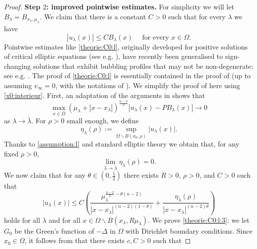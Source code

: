 \documentclass[10pt]{amsart}
\numberwithin{equation}{section}
\newcommand{\Om}{\Omega}
\def \xl{x_\lambda}
\def\la{\lambda}
\theoremstyle{plain}
\theoremstyle{remark}
\begin{document}
\begin{proof}
\textbf{Step $2$: improved pointwise estimates.} For simplicity we will let $B_\lambda = B_{x_\lambda, \mu_\lambda}$. We claim that there is a constant $C >0$ such that for every $\lambda$ we have
\begin{equation} \label{theorie:C0:l}
|u_\lambda(x) | \le C B_\lambda(x)\quad \text{ for every } x \in \Om.	
\end{equation}
Pointwise estimates like \eqref{theorie:C0:l}, originally developed for positive solutions of critical elliptic equations (see e.g. \cite{Druetdim3, DruetHebeyRobert}), have recently been generalised to sign-changing solutions that exhibit bubbling profiles that may not be non-degenerate: see e.g. \cite{Premoselli13, PremoselliRobert, PremoselliVetois4}. The proof of \eqref{theorie:C0:l} is essentially contained in the proof of \cite[Theorem 2.1]{CheikhAliPremoselli} (up to assuming $v_\infty = 0$, with the notations of \cite{CheikhAliPremoselli}). We simplify the proof of \cite[Theorem 2.1]{CheikhAliPremoselli} here using \eqref{x0:interieur}. First, an adaptation of the arguments in \cite[Proposition 2.2]{CheikhAliPremoselli} shows that
\begin{equation} \label{theorie:C0:l:1}
\max_{x \in \overline{\Om}} (\mu_\lambda + |x-x_\lambda|)^{\frac{n-2}{2}} | u_\lambda(x) - P B_\lambda(x) | \to 0 
\end{equation}
as $\lambda \to \bar{\lambda}$. For $\rho>0$ small enough, we define
\begin{equation*}
	\eta_{\lambda}(\rho):=\sup_{\Om\backslash B(x_0, \rho)} \big| u_\lambda(x)\big|.
\end{equation*} 
Thanks to \eqref{assumption:l} and standard elliptic theory we obtain that, for any fixed $\rho >0$,
\begin{equation}\label{theorie:C0:l:2}
	\lim_{\lambda \to \bar{\lambda}} \eta_{\lambda}(\rho)=0.
\end{equation} 
We now claim that for any $\theta \in (0,\frac{1}{2})$ there exists $R>0$, $\rho>0$, and $C>0$ such that 
\begin{equation}\label{theorie:C0:l:3}
\big|u_{\la}(x)\big|\leq C\left( \frac{\mu_\lambda^{\frac{n-2}{2}-\theta(n-2)}}{|x-\xl|^{(n-2)(1-\theta)}}+\frac{\eta_{\lambda}(\rho)}{|x-\xl|^{(n-2)\theta}}\right) 
\end{equation} 
holds for all $\lambda$ and for all $ x\in \Om \backslash B(\xl, R \mu_\lambda )$. We prove \eqref{theorie:C0:l:3}: we let $G_0$ be the Green's function of $-\Delta$ in $\Om$ with Dirichlet boundary conditions. Since $x_0 \in \Om$, it follows from \cite{RobDirichlet} that there exists $c,C>0$ such that 

\end{proof}
\end{document}

